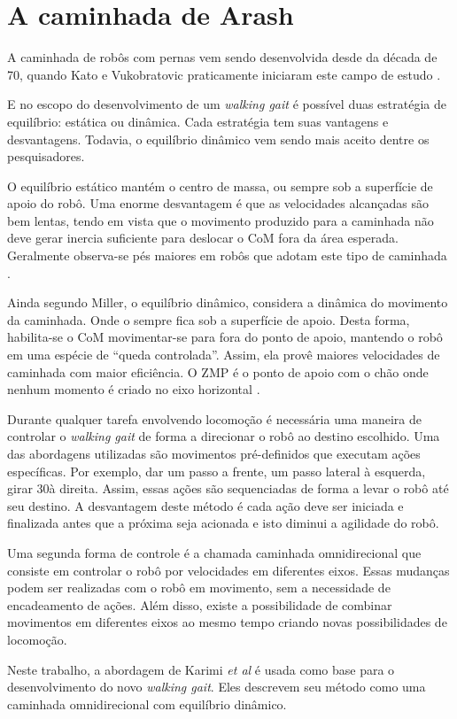 \chapter{A caminhada de Arash}

A caminhada de robôs com pernas vem sendo desenvolvida desde da década de 70, quando Kato e Vukobratovic praticamente iniciaram este campo de estudo \cite{kajita2008}.

E no escopo do desenvolvimento de um \textit{walking gait} é possível duas estratégia de equilíbrio: estática ou dinâmica. Cada estratégia tem suas vantagens e desvantagens. Todavia, o equilíbrio dinâmico vem sendo mais aceito dentre os pesquisadores.
	
O equilíbrio estático mantém o centro de massa, ou  sempre sob a superfície de apoio do robô. Uma enorme desvantagem é que as velocidades alcançadas são bem lentas, tendo em vista que o movimento produzido para a caminhada não deve gerar inercia suficiente para deslocar o CoM fora da área esperada. Geralmente observa-se pés maiores em robôs que adotam este tipo de caminhada \cite{miller1994}.

Ainda segundo Miller, o equilíbrio dinâmico, considera a dinâmica do movimento da caminhada. Onde o  sempre fica sob a superfície de apoio. Desta forma, habilita-se o CoM movimentar-se para fora do ponto de apoio, mantendo o robô em uma espécie de ``queda controlada''. Assim, ela provê maiores velocidades de caminhada com maior eficiência. O ZMP é o ponto de apoio com o chão onde nenhum momento é criado no eixo horizontal \cite{kajita2008}.

Durante qualquer tarefa envolvendo locomoção é necessária uma maneira de controlar o \textit{walking gait} de forma a direcionar o robô ao destino escolhido. Uma das abordagens utilizadas são movimentos pré-definidos que executam ações específicas. Por exemplo, dar um passo a frente, um passo lateral à esquerda, girar 30\degree à direita. Assim, essas ações são sequenciadas de forma a levar o robô até seu destino. A desvantagem deste método é cada ação deve ser iniciada e finalizada antes que a próxima seja acionada e isto diminui a agilidade do robô.

Uma segunda forma de controle é a chamada caminhada omnidirecional que consiste em controlar o robô por velocidades em diferentes eixos. Essas mudanças podem ser realizadas com o robô em movimento, sem a necessidade de encadeamento de ações. Além disso, existe a possibilidade de combinar movimentos em diferentes eixos ao mesmo tempo criando novas possibilidades de locomoção.

Neste trabalho, a abordagem de Karimi \textit{et al} é usada como base para o desenvolvimento do novo \textit{walking gait}. Eles descrevem seu método como uma caminhada omnidirecional com equilíbrio dinâmico.